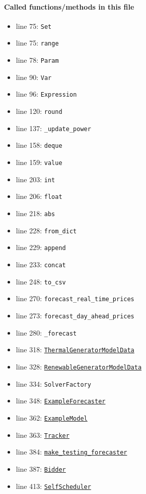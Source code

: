 \documentclass[11pt]{report}
\begin{document}
\paragraph{Called functions/methods in this file}
\begin{itemize}[leftmargin=*]
  \item line 75: \texttt{Set}
  \item line 75: \texttt{range}
  \item line 78: \texttt{Param}
  \item line 90: \texttt{Var}
  \item line 96: \texttt{Expression}
  \item line 120: \texttt{round}
  \item line 137: \texttt{\_update\_power}
  \item line 158: \texttt{deque}
  \item line 159: \texttt{value}
  \item line 203: \texttt{int}
  \item line 206: \texttt{float}
  \item line 218: \texttt{abs}
  \item line 228: \texttt{from\_dict}
  \item line 229: \texttt{append}
  \item line 233: \texttt{concat}
  \item line 248: \texttt{to\_csv}
  \item line 270: \texttt{forecast\_real\_time\_prices}
  \item line 273: \texttt{forecast\_day\_ahead\_prices}
  \item line 280: \texttt{\_forecast}
  \item line 318: \hyperref[def:model_data.py:ThermalGeneratorModelData:L185]{\texttt{ThermalGeneratorModelData}}
  \item line 328: \hyperref[def:model_data.py:RenewableGeneratorModelData:L391]{\texttt{RenewableGeneratorModelData}}
  \item line 334: \texttt{SolverFactory}
  \item line 348: \hyperref[def:tests-util.py:ExampleForecaster:L259]{\texttt{ExampleForecaster}}
  \item line 362: \hyperref[def:tests-util.py:ExampleModel:L25]{\texttt{ExampleModel}}
  \item line 363: \hyperref[def:tracker.py:Tracker:L19]{\texttt{Tracker}}
  \item line 384: \hyperref[def:tests-util.py:make_testing_forecaster:L337]{\texttt{make\_testing\_forecaster}}
  \item line 387: \hyperref[def:bidder.py:Bidder:L1000]{\texttt{Bidder}}
  \item line 413: \hyperref[def:bidder.py:SelfScheduler:L780]{\texttt{SelfScheduler}}
\end{itemize}
\end{document}
